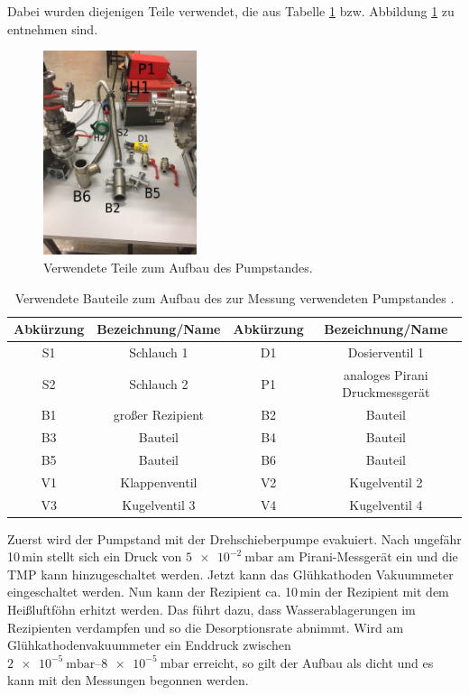 Dabei wurden diejenigen Teile verwendet, die aus Tabelle \ref{tab:Teile} bzw. Abbildung
\ref{fig:Teile} zu entnehmen sind.

\begin{figure}
  \centering
  \includegraphics[width=0.4\textwidth]{IMG_6891.JPG}
  \caption{Verwendete Teile zum Aufbau des Pumpstandes.}
  \label{fig:Teile}
\end{figure}

\begin{table}
  \caption{Verwendete Bauteile zum Aufbau des zur Messung verwendeten Pumpstandes \cite{anleitung}.}
  \label{tab:Teile}
  \begin{tabular}{c c | c c}
    \toprule
    Abkürzung & Bezeichnung/Name & Abkürzung & Bezeichnung/Name \\
    \midrule
    S1 & Schlauch 1 & D1 & Dosierventil 1 \\
    S2 & Schlauch 2 & P1 & analoges Pirani Druckmessgerät \\
    B1 & großer Rezipient & B2 & Bauteil \\
    B3 & Bauteil & B4 & Bauteil \\
    B5 & Bauteil & B6 & Bauteil \\
    V1 & Klappenventil & V2 & Kugelventil 2 \\
    V3 & Kugelventil 3 & V4 & Kugelventil 4 \\
  \end{tabular}
\end{table}
Zuerst wird der Pumpstand mit der Drehschieberpumpe evakuiert. Nach ungefähr 10$\,$min
stellt sich ein Druck von $\SI{5e-2}{\milli\bar}$ am Pirani-Messgerät ein und die TMP kann hinzugeschaltet
werden.
Jetzt kann das Glühkathoden Vakuummeter eingeschaltet werden. Nun kann der Rezipient
ca. 10$\,$min der Rezipient mit dem Heißluftföhn erhitzt werden. Das führt dazu,
dass Wasserablagerungen im Rezipienten verdampfen und so die Desorptionsrate abnimmt.
Wird am Glühkathodenvakuummeter ein Enddruck zwischen $\SIrange{2e-5}{8e-5}{\milli\bar}$ erreicht, so gilt der
Aufbau als dicht und es kann mit den Messungen begonnen werden.

